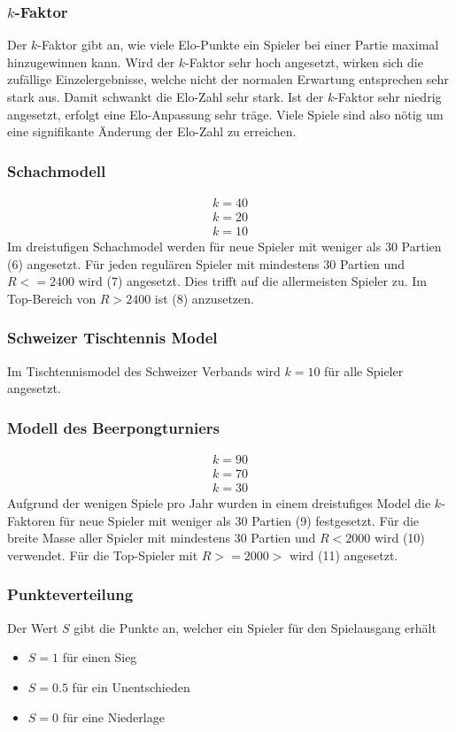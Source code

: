 \documentclass[a5paper, 12pt]{article}
\newcounter{arti}
\begin{document}
\subsubsection{\(k\)-Faktor}
Der \(k\)-Faktor gibt an, wie viele Elo-Punkte ein Spieler bei einer Partie maximal hinzugewinnen kann.
Wird der \(k\)-Faktor sehr hoch angesetzt, wirken sich die zufällige Einzelergebnisse, welche nicht der normalen Erwartung entsprechen sehr stark aus. Damit schwankt die Elo-Zahl sehr stark.
Ist der \(k\)-Faktor sehr niedrig angesetzt, erfolgt eine Elo-Anpassung sehr träge. Viele Spiele sind also nötig um eine signifikante Änderung der Elo-Zahl zu erreichen.
\subsubsection{Schachmodell}
\begin{align}
k=40
\\k=20
\\k=10
\end{align}
Im dreistufigen Schachmodel werden für neue Spieler mit weniger als 30 Partien (6) angesetzt.
Für jeden regulären Spieler mit mindestens 30 Partien und \(R <= 2400\) wird (7) angesetzt. Dies trifft auf die allermeisten Spieler zu.
Im Top-Bereich von \(R > 2400 \) ist (8) anzusetzen.
\subsubsection{Schweizer Tischtennis Model}
Im Tischtennismodel des Schweizer Verbands wird \(k=10\) für alle Spieler angesetzt.
\subsubsection{Modell des Beerpongturniers}
\begin{align}
k=90
\\k=70
\\k=30
\end{align}
Aufgrund der wenigen Spiele pro Jahr wurden in einem dreistufiges Model die \(k\)-Faktoren für neue Spieler mit weniger als 30 Partien (9) festgesetzt. Für die breite Masse aller Spieler mit mindestens 30 Partien und \(R< 2000\) wird (10) verwendet. Für die Top-Spieler mit \(R>=2000>\) wird (11) angesetzt.
\subsubsection{Punkteverteilung}
Der Wert \(S\) gibt die Punkte an, welcher ein Spieler für den Spielausgang erhält
\begin{itemize}
\item \(S = 1\) für einen Sieg
\item \(S = 0.5\) für ein Unentschieden
\item \(S = 0\) für eine Niederlage
\end{itemize}
\end{document}
